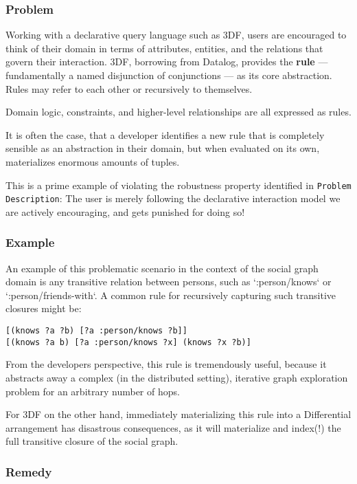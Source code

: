 \documentclass[../catalog.tex]{subfiles}
\begin{document}
\subsubsection{Problem}

Working with a declarative query language such as 3DF, users are
encouraged to think of their domain in terms of attributes, entities,
and the relations that govern their interaction. 3DF, borrowing from
Datalog, provides the \textbf{rule} — fundamentally a named disjunction of
conjunctions — as its core abstraction. Rules may refer to each other
or recursively to themselves.

Domain logic, constraints, and higher-level relationships are all
expressed as rules.

It is often the case, that a developer identifies a new rule that is
completely sensible as an abstraction in their domain, but when
evaluated on its own, materializes enormous amounts of tuples. 

This is a prime example of violating the robustness property
identified in \texttt{Problem Description}: The user is merely following
the declarative interaction model we are actively encouraging, and
gets punished for doing so!

\subsubsection{Example}

An example of this problematic scenario in the context of the social
graph domain is any transitive relation between persons, such as
`:person/knows` or `:person/friends-with`. A common rule for
recursively capturing such transitive closures might be:

\begin{verbatim}
[(knows ?a ?b) [?a :person/knows ?b]]
[(knows ?a b) [?a :person/knows ?x] (knows ?x ?b)]
\end{verbatim}

From the developers perspective, this rule is tremendously useful,
because it abstracts away a complex (in the distributed setting),
iterative graph exploration problem for an arbitrary number of hops.

For 3DF on the other hand, immediately materializing this rule into a
Differential arrangement has disastrous consequences, as it will
materialize and index(!) the full transitive closure of the social
graph.

\subsubsection{Remedy}
\end{document}
